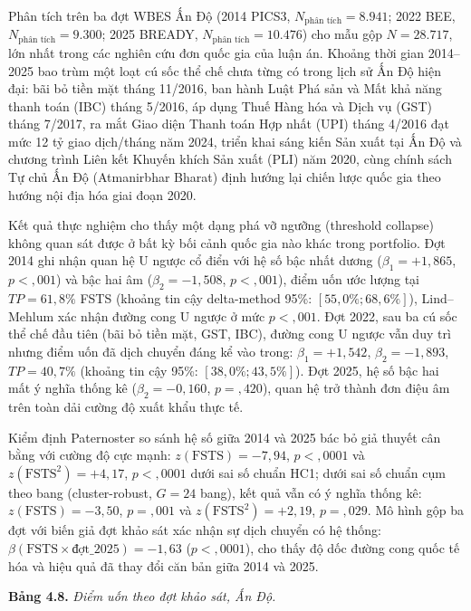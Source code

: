 \documentclass[
  a4paper,
  13pt]{extreport}
\begin{document}
Phân tích trên ba đợt WBES Ấn Độ (2014 PICS3,
\(N_{\text{phân tích}} = 8.941\); 2022 BEE,
\(N_{\text{phân tích}} = 9.300\); 2025 BREADY,
\(N_{\text{phân tích}} = 10.476\)) cho mẫu gộp \(N = 28.717\), lớn nhất
trong các nghiên cứu đơn quốc gia của luận án. Khoảng thời gian
2014--2025 bao trùm một loạt cú sốc thể chế chưa từng có trong lịch sử
Ấn Độ hiện đại: bãi bỏ tiền mặt tháng 11/2016, ban hành Luật Phá sản và
Mất khả năng thanh toán (IBC) tháng 5/2016, áp dụng Thuế Hàng hóa và
Dịch vụ (GST) tháng 7/2017, ra mắt Giao diện Thanh toán Hợp nhất (UPI)
tháng 4/2016 đạt mức 12 tỷ giao dịch/tháng năm 2024, triển khai sáng
kiến Sản xuất tại Ấn Độ và chương trình Liên kết Khuyến khích Sản xuất
(PLI) năm 2020, cùng chính sách Tự chủ Ấn Độ (Atmanirbhar Bharat) định
hướng lại chiến lược quốc gia theo hướng nội địa hóa giai đoạn 2020.

Kết quả thực nghiệm cho thấy một dạng phá vỡ ngưỡng (threshold collapse)
không quan sát được ở bất kỳ bối cảnh quốc gia nào khác trong portfolio.
Đợt 2014 ghi nhận quan hệ U ngược cổ điển với hệ số bậc nhất dương
(\(\beta_1 = +1{,}865\), \(p < {,}001\)) và bậc hai âm
(\(\beta_2 = -1{,}508\), \(p < {,}001\)), điểm uốn ước lượng tại
\(TP = 61{,}8\%\) FSTS (khoảng tin cậy delta-method 95\%:
\([55{,}0\%; 68{,}6\%]\)), Lind--Mehlum xác nhận đường cong U ngược ở
mức \(p < {,}001\). Đợt 2022, sau ba cú sốc thể chế đầu tiên (bãi bỏ
tiền mặt, GST, IBC), đường cong U ngược vẫn duy trì nhưng điểm uốn đã
dịch chuyển đáng kể vào trong: \(\beta_1 = +1{,}542\),
\(\beta_2 = -1{,}893\), \(TP = 40{,}7\%\) (khoảng tin cậy 95\%:
\([38{,}0\%; 43{,}5\%]\)). Đợt 2025, hệ số bậc hai mất ý nghĩa thống kê
(\(\beta_2 = -0{,}160\), \(p = {,}420\)), quan hệ trở thành đơn điệu âm
trên toàn dải cường độ xuất khẩu thực tế.

Kiểm định Paternoster so sánh hệ số giữa 2014 và 2025 bác bỏ giả thuyết
cân bằng với cường độ cực mạnh: \(z(\text{FSTS}) = -7{,}94\),
\(p < {,}0001\) và \(z(\text{FSTS}^2) = +4{,}17\), \(p < {,}0001\) dưới
sai số chuẩn HC1; dưới sai số chuẩn cụm theo bang (cluster-robust,
\(G = 24\) bang), kết quả vẫn có ý nghĩa thống kê:
\(z(\text{FSTS}) = -3{,}50\), \(p = {,}001\) và
\(z(\text{FSTS}^2) = +2{,}19\), \(p = {,}029\). Mô hình gộp ba đợt với
biến giả đợt khảo sát xác nhận sự dịch chuyển có hệ thống:
\(\beta(\text{FSTS} \times \text{đợt}\_2025) = -1{,}63\)
(\(p < {,}0001\)), cho thấy độ dốc đường cong quốc tế hóa và hiệu quả đã
thay đổi căn bản giữa 2014 và 2025.

\textbf{Bảng 4.8.} \emph{Điểm uốn theo đợt khảo sát, Ấn Độ.}
\end{document}
